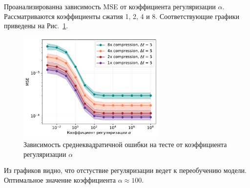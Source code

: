 \documentclass[12pt,twoside]{article}
\begin{document}
Проанализированна зависимость MSE от коэффициента регуляризации $\alpha$.
Рассматриваются коэффициенты сжатия 1, 2, 4 и 8. 
Соответствующие графики приведены на Рис.~\ref{subs_MSE_alpha}.
\begin{figure}[h!]
    \centering
    \includegraphics[width=0.65\textwidth]{subs_MSE_alpha.pdf}
    \caption{Зависимость среднеквадратичной ошибки на тесте от коэффициента регуляризации $\alpha$}
    \label{subs_MSE_alpha}
\end{figure}
Из графиков видно, что отстуствие регуляризации ведет к переобучению модели.
Оптимальное значение коэффициента $\alpha \approx 100$.
\end{document}
